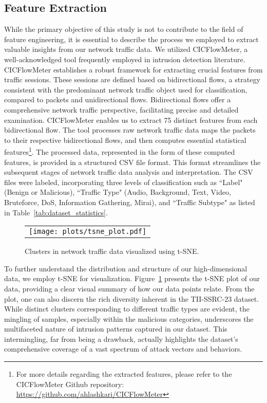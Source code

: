 \documentclass[lettersize,journal]{IEEEtran}
\begin{document}
\subsection{Feature Extraction}\label{sec:feat_extraction}

While the primary objective of this study is not to contribute to the field of feature engineering, it is essential to describe the process we employed to extract valuable insights from our network traffic data. We utilized CICFlowMeter, a well-acknowledged tool frequently employed in intrusion detection literature. CICFlowMeter establishes a robust framework for extracting crucial features from traffic sessions. These sessions are defined based on bidirectional flows, a strategy consistent with the predominant network traffic object used for classification, compared to packets and unidirectional flows. Bidirectional flows offer a comprehensive network traffic perspective, facilitating precise and detailed examination. 
CICFlowMeter enables us to extract 75 distinct features from each bidirectional flow. The tool processes raw network traffic data maps the packets to their respective bidirectional flows, and then computes essential statistical features\footnote{For more details regarding the extracted features, please refer to the CICFlowMeter Github repository: \url{https://github.com/ahlashkari/CICFlowMeter}}. The processed data, represented in the form of these computed features, is provided in a structured \ac{CSV} file format. This format streamlines the subsequent stages of network traffic data analysis and interpretation. The \ac{CSV} files were labeled, incorporating three levels of classification such as ``Label" (Benign or Malicious), ``Traffic Type" (Audio, Background, Text, Video, Bruteforce, DoS, Information Gathering, Mirai), and ``Traffic Subtype" as listed in Table~\ref{tab:dataset_statistics}.

\begin{figure}[!t]
    \footnotesize
    \centering
    \begin{tabular}{c}
         \texttt{[image: plots/tsne\_plot.pdf]}
    \end{tabular} 
    \caption{Clusters in network traffic data visualized using t-SNE.} 
    \label{fig:tsne}
\end{figure}  

To further understand the distribution and structure of our high-dimensional data, we employ \ac{t-SNE} for visualization. Figure~\ref{fig:tsne} presents the \ac{t-SNE} plot of our data, providing a clear visual summary of how our data points relate. From the plot, one can also discern the rich diversity inherent in the TII-SSRC-23 dataset. While distinct clusters corresponding to different traffic types are evident, the mingling of samples, especially within the malicious categories, underscores the multifaceted nature of intrusion patterns captured in our dataset. This intermingling, far from being a drawback, actually highlights the dataset's comprehensive coverage of a vast spectrum of attack vectors and behaviors.
  
\end{document}
